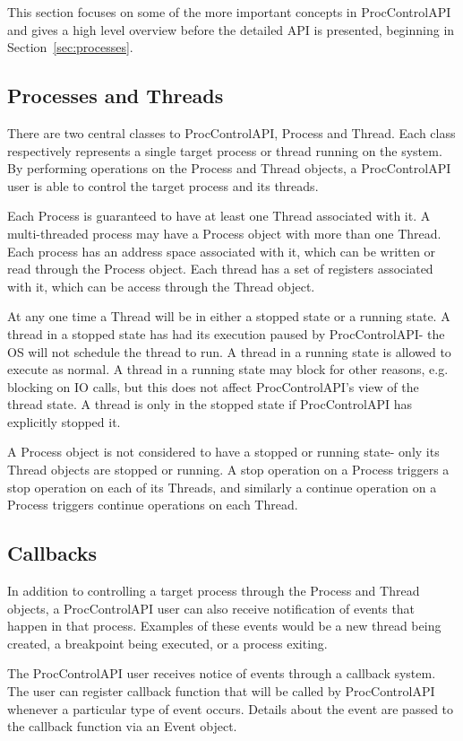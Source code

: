 This section focuses on some of the more important concepts in ProcControlAPI
and gives a high level overview before the detailed API is presented,
beginning in Section~\ref{sec:processes}.

\subsection{Processes and Threads}
There are two central classes to ProcControlAPI, Process and Thread.
Each class respectively represents a single
target process or thread running on the system. By performing operations on
the Process and Thread objects, a ProcControlAPI user is able to control the
target process and its threads.

Each Process is guaranteed to have at least one Thread associated with it. A
multi-threaded process may have a Process object with more than one Thread.
Each process has an address space associated with it, which can be written or
read through the Process object. Each thread has a set of registers
associated with it, which can be access through the Thread object.

At any one time a Thread will be in either a stopped state or a running
state. A thread in a
stopped state has had its execution paused by
ProcControlAPI- the OS will not schedule the thread to run.
A thread in a running state is allowed to execute as normal. A thread in a
running state may block for other reasons, e.g. blocking on IO calls, but this
does not affect ProcControlAPI's view of the thread state.
A thread is only in the stopped state if ProcControlAPI has explicitly
stopped it.

A Process object is not considered to have a stopped or running
state- only its Thread objects are stopped or running. A
stop operation on a Process triggers a stop operation on each of its Threads,
and similarly a continue operation on a Process triggers continue operations on
each Thread.

\subsection{Callbacks}
In addition to controlling a target process through the Process and Thread
objects, a ProcControlAPI user can also receive notification of events that
happen in that process. Examples of these events would be a new thread being
created, a breakpoint being executed, or a process exiting.

The ProcControlAPI user receives notice of events through a callback system.
The user can register callback function that will be called by ProcControlAPI
whenever a particular type of event occurs. Details about the event are
passed to the callback function via an Event object.

